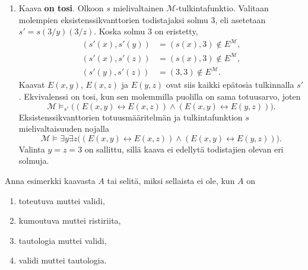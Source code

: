 \documentclass[11pt,a4paper]{amsart}
\begin{document}
\begin{solution}
\begin{enumerate}[label=(\alph*)]
    \item Kaava \textbf{on tosi}. Olkoon \(s\) mielivaltainen
      \(\mathcal M\)-tulkintafunktio. Valitaan molempien
      eksistenssikvanttorien todistajaksi solmu \(3\), eli asetetaan
      \(s'=s(3/y)(3/z)\). Koska solmu \(3\) on eristetty,
      \[
        \begin{aligned}
          (s'(x),s'(y))&=(s(x),3)\notin E^{\mathcal M},\\
          (s'(x),s'(z))&=(s(x),3)\notin E^{\mathcal M},\\
          (s'(y),s'(z))&=(3,3)\notin E^{\mathcal M}.
        \end{aligned}
      \]
      Kaavat \(E(x,y)\), \(E(x,z)\) ja \(E(y,z)\) ovat siis
      kaikki epätosia tulkinnalla \(s'\). Ekvivalenssi on tosi,
      kun sen molemmilla puolilla on sama totuusarvo, joten
      \[
        \mathcal M\models_{s'}
        \bigl((E(x,y)\leftrightarrow E(x,z))\land
        (E(x,y)\leftrightarrow E(y,z))\bigr).
      \]
      Eksistenssikvanttorien totuusmääritelmän ja tulkintafunktion
      \(s\) mielivaltaisuuden nojalla
      \[
        \mathcal M\models\exists y\exists z
        \bigl((E(x,y)\leftrightarrow E(x,z))\land
        (E(x,y)\leftrightarrow E(y,z))\bigr).
      \]
      Valinta \(y=z=3\) on sallittu, sillä kaava ei edellytä
      todistajien olevan eri solmuja.\qedhere
  \end{enumerate}
\end{solution}

\begin{samepage}
  \begin{exercise}
    Anna esimerkki kaavasta \(A\) tai selitä, miksi sellaista ei ole,
    kun \(A\) on
    \begin{enumerate}[label=(\alph*)]
      \item toteutuva muttei validi,
      \item kumoutuva muttei ristiriita,
      \item tautologia muttei validi,
      \item validi muttei tautologia.
    \end{enumerate}
  \end{exercise}
\end{samepage}
\end{document}
